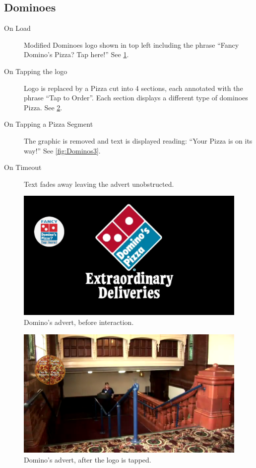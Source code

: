 \clearpage
\subsection{Dominoes}
	\begin{description}
		\item[On Load]{Modified Dominoes logo shown in top left including the phrase ``Fancy Domino's Pizza? Tap here!'' See \ref{fig:Dominos1}.}
		\item[On Tapping the logo]{Logo is replaced by a Pizza cut into 4 sections, each annotated with the phrase ``Tap to Order''. Each section displays a different type of dominoes Pizza. See \ref{fig:Dominos2}.}
		\item[On Tapping a Pizza Segment]{The graphic is removed and text is displayed reading: ``Your Pizza is on its way!'' See \ref{fig:Dominos3}.}
		\item[On Timeout]{Text fades away leaving the advert unobstructed.}
	\end{description}

	\begin{figure}[th]
		\centering
		\includegraphics[width=\textwidth,height=0.5\textheight,keepaspectratio]{images/adverts/dominos-1.png}
		\caption{Domino's advert, before interaction.}
		\label{fig:Dominos1}
	\end{figure}

	\begin{figure}[th]
		\centering
		\includegraphics[width=\textwidth,height=0.5\textheight,keepaspectratio]{images/adverts/dominos-2.png}
		\caption{Domino's advert, after the logo is tapped.}
		\label{fig:Dominos2}
	\end{figure}

